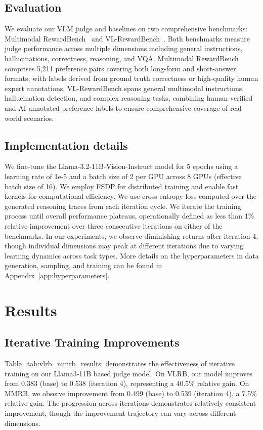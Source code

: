 \subsection{Evaluation}

We evaluate our VLM judge and baselines on two comprehensive benchmarks: Multimodal RewardBench~\cite{mmrb} and VL-RewardBench~\cite{vlrb}. Both benchmarks measure judge performance across multiple dimensions including general instructions, hallucinations, correctness, reasoning, and VQA. Multimodal RewardBench comprises 5,211 preference pairs covering both long-form and short-answer formats, with labels derived from ground truth correctness or high-quality human expert annotations. VL-RewardBench spans general multimodal instructions, hallucination detection, and complex reasoning tasks, combining human-verified and AI-annotated preference labels to ensure comprehensive coverage of real-world scenarios.

\subsection{Implementation details}

We fine-tune the Llama-3.2-11B-Vision-Instruct model for 5 epochs using a learning rate of 1e-5 and a batch size of 2 per GPU across 8 GPUs (effective batch size of 16). We employ FSDP for distributed training and enable fast kernels for computational efficiency. We use cross-entropy loss computed over the generated reasoning traces from each iteration cycle. 
We iterate the training process until overall performance plateaus, operationally 
defined as less than 1\% relative improvement over three consecutive iterations on either of the benchmarks. 
In our experiments, we observe diminishing returns after iteration 4, though individual dimensions may peak at different iterations due to varying learning 
dynamics across task types. More details on the hyperparameters in data generation, sampling, and training can be found in Appendix~\ref{app:hyperparameters}.




\section{Results}

\subsection{Iterative Training Improvements} Table~\ref{tab:vlrb_mmrb_results} demonstrates the effectiveness of iterative training on our Llama3-11B based judge model. On VLRB, our model improves from 0.383 (base) to 0.538 (iteration 4), representing a 40.5\% relative gain. On MMRB, we observe improvement from 0.499 (base) to 0.539 (iteration 4), a 7.5\% relative gain. 
The progression across iterations demonstrates relatively consistent improvement, though the improvement trajectory can vary across different dimensions.

